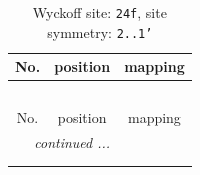 \documentclass[fleqn,8pt]{jsarticle}
\begin{document}
\renewcommand{\arraystretch}{1.2}
\begin{longtable}{ccc}
\caption{Wyckoff site: {\tt 24f}, site symmetry: {\tt 2..1'}}
 \\
 \hline \hline
No. & position & mapping \\ \hline \endfirsthead

\multicolumn{2}{l}{\tablename\ \thetable{}} \\
 \hline \hline
No. & position & mapping \\ \hline \endhead

 \hline \hline
\multicolumn{2}{r}{\footnotesize\it continued ...} \\ \endfoot

 \hline \hline
\multicolumn{2}{r}{} \\ \endlastfoot


\end{longtable}
\end{document}
